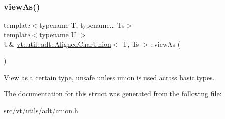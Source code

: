 \subsubsection{\texorpdfstring{view\+As()}{viewAs()}}
{\footnotesize\ttfamily template$<$typename T, typename... Ts$>$ \\
template$<$typename U $>$ \\
U\& \hyperlink{structvt_1_1util_1_1adt_1_1_aligned_char_union}{vt\+::util\+::adt\+::\+Aligned\+Char\+Union}$<$ T, Ts $>$\+::view\+As (\begin{DoxyParamCaption}{ }\end{DoxyParamCaption})\hspace{0.3cm}{\ttfamily [inline]}}



View as a certain type, unsafe unless union is used across basic types. 



The documentation for this struct was generated from the following file\+:\begin{DoxyCompactItemize}
\item 
src/vt/utils/adt/\hyperlink{union_8h}{union.\+h}\end{DoxyCompactItemize}
